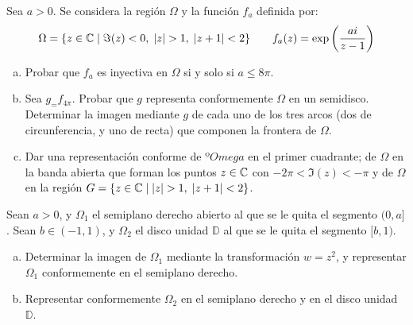 \documentclass[twoside]{article}
\begin{document}
\begin{ejercicio}{12}
Sea $a>0$. Se considera la región $\Omega$ y la función $f_a$ definida por:
$$
\Omega=\{z\in \C \mid \Im(z)<0,\;|z|>1,\;|z+1|<2\} \qquad f_a(z)=\exp\left(\frac{ai}{z-1}\right)
$$
\begin{enumerate}[(a)]
\item Probar que $f_a$ es inyectiva en $\Omega$ si y solo si $a\leq 8\pi$.
\item Sea $g_=f_{4\pi}$. Probar que $g$ representa conformemente $\Omega$ en un semidisco. Determinar la imagen mediante $g$ de cada uno de los tres arcos (dos de circunferencia, y uno de recta) que componen la frontera de $\Omega$.
\item Dar una representación conforme de $ºOmega$ en el primer cuadrante; de $\Omega$ en la banda abierta que forman los puntos  $z\in \mathbb{C}$ con $-2\pi<\Im(z) <-\pi$ y de $\Omega$ en la región $G=\{z\in\C\mid |z|>1,\;|z+1|<2\}$.
\end{enumerate}
\end{ejercicio}
\begin{solucion}
\end{solucion}
\newpage



\begin{ejercicio}{13}
Sean $a>0$, y $\Omega_1$ el semiplano derecho abierto al que se le quita el segmento $(0,a]$. Sean $b\in(-1,1)$, y $\Omega_2$ el disco unidad $\mathbb{D}$ al que se le quita el segmento $[b,1)$.
\begin{enumerate}[(a)]
\item Determinar la imagen de $\Omega_1$ mediante la transformación $w=z^2$, y representar $\Omega_1$ conformemente en el semiplano derecho.
\item Representar conformemente $\Omega_2$ en el semiplano derecho y en el disco unidad $\mathbb{D}$.
\end{enumerate}
\end{ejercicio}
\begin{solucion}
\end{solucion}
\newpage
\end{document}
